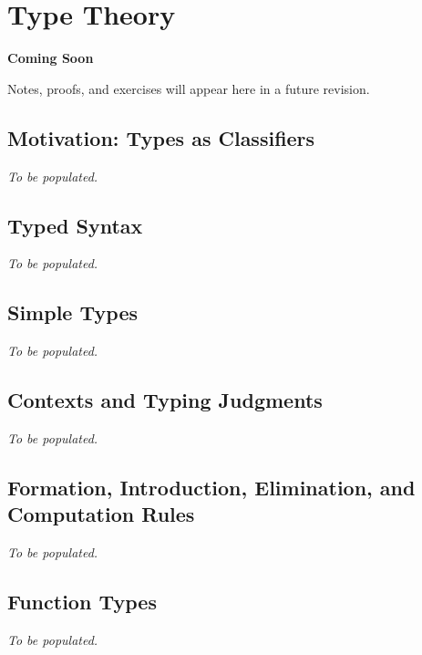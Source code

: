 \chapter{Type Theory}


\vspace{1em}
\begin{tcolorbox}[
  colback=gray!6, colframe=gray!40, arc=2pt,
  left=8pt, right=8pt, top=6pt, bottom=6pt,
  title={\small\textbf{Status: Planned}},
  fonttitle=\small\bfseries
]
\begin{center}\Large\bfseries Coming Soon\end{center}
\vspace{6pt}
\noindent Notes, proofs, and exercises will appear here in a future revision.
\end{tcolorbox}

\section{Motivation: Types as Classifiers}
\textit{To be populated.}

\section{Typed Syntax}
\textit{To be populated.}

\section{Simple Types}
\textit{To be populated.}

\section{Contexts and Typing Judgments}
\textit{To be populated.}

\section{Formation, Introduction, Elimination, and Computation Rules}
\textit{To be populated.}

\section{Function Types}
\textit{To be populated.}

